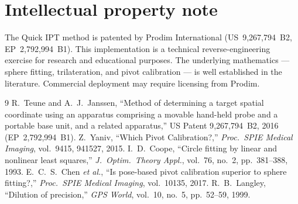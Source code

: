 \documentclass[11pt,a4paper]{article}
\begin{document}
\section*{Intellectual property note}

The Quick IPT method is patented by Prodim International (US~9{,}267{,}794~B2,
EP~2{,}792{,}994~B1). This implementation is a technical reverse-engineering exercise
for research and educational purposes. The underlying mathematics --- sphere
fitting, trilateration, and pivot calibration --- is well established in the
literature. Commercial deployment may require licensing from Prodim.

\begin{thebibliography}{9}
  R.~Teune and A.~J.~Janssen,
  ``Method of determining a target spatial coordinate using an apparatus comprising
  a movable hand-held probe and a portable base unit, and a related apparatus,''
  US Patent 9{,}267{,}794~B2, 2016 (EP~2{,}792{,}994~B1).
  Z.~Yaniv,
  ``Which Pivot Calibration?,''
  \emph{Proc.\ SPIE Medical Imaging}, vol.~9415, 941527, 2015.
  I.~D.~Coope,
  ``Circle fitting by linear and nonlinear least squares,''
  \emph{J.\ Optim.\ Theory Appl.}, vol.~76, no.~2, pp.~381--388, 1993.
  E.~C.~S.~Chen \emph{et al.},
  ``Is pose-based pivot calibration superior to sphere fitting?,''
  \emph{Proc.\ SPIE Medical Imaging}, vol.~10135, 2017.
  R.~B.~Langley,
  ``Dilution of precision,''
  \emph{GPS World}, vol.~10, no.~5, pp.~52--59, 1999.
\end{thebibliography}
\end{document}
